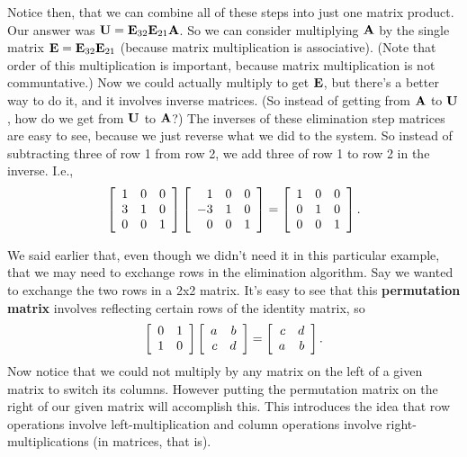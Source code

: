 Notice then, that we can combine all of these steps into just one matrix product. Our answer was $\boldsymbol{\mathbf{U}} = \boldsymbol{\mathbf{E}}_{32}\boldsymbol{\mathbf{E}}_{21}\boldsymbol{\mathbf{A}}$. So we can consider multiplying $\boldsymbol{\mathbf{A}}$ by the single matrix $\boldsymbol{\mathbf{E}} = \boldsymbol{\mathbf{E}}_{32}\boldsymbol{\mathbf{E}}_{21}$ (because matrix multiplication is associative). (Note that order of this multiplication is important, because matrix multiplication is not communtative.) Now we could actually multiply to get $\boldsymbol{\mathbf{E}}$, but there's a better way to do it, and it involves inverse matrices. (So instead of getting from $\boldsymbol{\mathbf{A}}$ to $\boldsymbol{\mathbf{U}}$, how do we get from $\boldsymbol{\mathbf{U}}$ to $\boldsymbol{\mathbf{A}}$?) The inverses of these elimination step matrices are easy to see, because we just reverse what we did to the system. So instead of subtracting three of row 1 from row 2, we add three of row 1 to row 2 in the inverse. I.e., 
\[ \left[ \begin{array}{rrrrrrrrrrrrrrrrrrrrrrrrr} 1&0&0\\3&1&0\\0&0&1\\ \end{array} \right]\left[ \begin{array}{rrrrrrrrrrrrrrrrrrrrrrrrr} 1&0&0\\-3&1&0\\0&0&1\\ \end{array} \right] = \left[ \begin{array}{rrrrrrrrrrrrrrrrrrrrrrrrr} 1&0&0\\0&1&0\\0&0&1\\ \end{array} \right]. \]
\eex
 
\brm
We said earlier that, even though we didn't need it in this particular example, that we may need to exchange rows in the elimination algorithm. Say we wanted to exchange the two rows in a 2x2 matrix. It's easy to see that this \textbf{permutation matrix} involves reflecting certain rows of the identity matrix, so
\[ \left[ \begin{array}{rrrrrrrrrrrrrrrrrrrrrrrrr} 0&1\\1&0\\ \end{array} \right]\left[ \begin{array}{rrrrrrrrrrrrrrrrrrrrrrrrr} a&b\\c&d\\ \end{array} \right] = \left[ \begin{array}{rrrrrrrrrrrrrrrrrrrrrrrrr} c&d\\a&b\\ \end{array} \right]. \]
Now notice that we could not multiply by any matrix on the left of a given matrix to switch its columns. However putting the permutation matrix on the right of our given matrix will accomplish this. This introduces the idea that row operations involve left-multiplication and column operations involve right-multiplications (in matrices, that is).
\erm